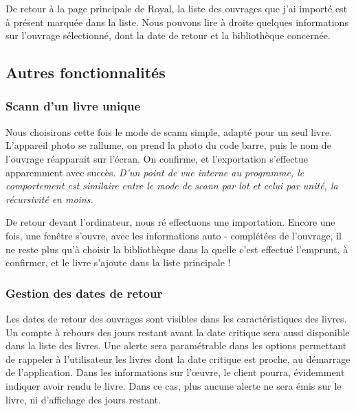 De retour à la page principale de Royal, la liste des ouvrages que j'ai importé est à présent marquée dans la liste. 
Nous pouvons lire à droite quelques informations sur l'ouvrage sélectionné, dont la date de retour et la bibliothèque concernée. 

\subsection {Autres fonctionnalités}

\subsubsection {Scann d'un livre unique}
Nous choisirons cette fois le mode de scann simple, adapté pour un seul livre. 
L'appareil photo se rallume, on prend la photo du code barre, puis le nom de l'ouvrage réapparait sur l'écran.
On confirme, et l'exportation s'effectue apparemment avec succès. 
\emph{D'un point de vue interne au programme, le comportement est similaire entre le mode de scann par lot et celui par unité, la récursivité en moins.}

De retour devant l'ordinateur, nous ré effectuons une importation. 
Encore une fois, une fenêtre s'ouvre, avec les informations auto - complétées de l'ouvrage, il ne reste plus qu'à choisir la bibliothèque dans la quelle c'est effectué l'emprunt, à confirmer, et le livre s'ajoute dans la liste principale !

\subsubsection {Gestion des dates de retour}
Les dates de retour des ouvrages sont visibles dans les caractéristiques des livres. 
Un compte à rebours des jours restant avant la date critique sera aussi disponible dans la liste des livres.
Une alerte sera paramétrable dans les options permettant de rappeler à l'utilisateur les livres dont la date critique est proche, au démarrage de l'application.
Dans les informations sur l'œuvre, le client pourra, évidemment indiquer avoir rendu le livre.
Dans ce cas, plus aucune alerte ne sera émis sur le livre, ni d'affichage des jours restant.

